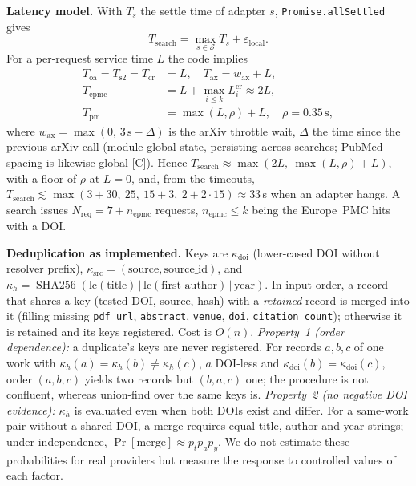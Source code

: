 \documentclass[conference]{IEEEtran}
\newcommand{\code}[1]{\texttt{\small #1}}
\begin{document}
\textbf{Latency model.} With $T_s$ the settle time of adapter $s$, \code{Promise.allSettled} gives
\begin{equation}
T_{\text{search}} = \max_{s\in\mathcal S} T_s + \varepsilon_{\text{local}}.
\label{eq:tsearch}
\end{equation}
For a per-request service time $L$ the code implies
\begin{align}
T_{\text{oa}} = T_{\text{s2}} = T_{\text{cr}} &= L, \quad T_{\text{ax}} = w_{\text{ax}} + L, \nonumber\\
T_{\text{epmc}} &= L + \max_{i\le k} L^{\text{cr}}_i \approx 2L, \nonumber\\
T_{\text{pm}} &= \max(L,\rho) + L, \quad \rho = 0.35\,\text{s},
\label{eq:adapters}
\end{align}
where $w_{\text{ax}}=\max(0,\,3\,\text{s}-\Delta)$ is the arXiv throttle wait, $\Delta$ the time since the previous arXiv call (module-global state, persisting across searches; PubMed spacing is likewise global [C]). Hence $T_{\text{search}} \approx \max(2L,\ \max(L,\rho)+L)$, with a floor of $\rho$ at $L{=}0$, and, from the timeouts, $T_{\text{search}} \lesssim \max(3{+}30,\ 25,\ 15{+}3,\ 2{+}2{\cdot}15)\approx 33$\,s when an adapter hangs. A search issues $N_{\text{req}} = 7+n_{\text{epmc}}$ requests, $n_{\text{epmc}}\le k$ being the Europe~PMC hits with a DOI.

\textbf{Deduplication as implemented.} Keys are $\kappa_{\text{doi}}$ (lower-cased DOI without resolver prefix), $\kappa_{\text{src}}=(\text{source},\text{source\_id})$, and $\kappa_{h}=\operatorname{SHA256}(\text{lc}(\text{title})\,|\,\text{lc}(\text{first author})\,|\,\text{year})$. In input order, a record that shares a key (tested DOI, source, hash) with a \emph{retained} record is merged into it (filling missing \code{pdf\_url}, \code{abstract}, \code{venue}, \code{doi}, \code{citation\_count}); otherwise it is retained and its keys registered. Cost is $O(n)$.
\emph{Property~1 (order dependence):} a duplicate's keys are never registered. For records $a,b,c$ of one work with $\kappa_h(a)=\kappa_h(b)\ne\kappa_h(c)$, $a$ DOI-less and $\kappa_{\text{doi}}(b)=\kappa_{\text{doi}}(c)$, order $(a,b,c)$ yields two records but $(b,a,c)$ one; the procedure is not confluent, whereas union-find over the same keys is.
\emph{Property~2 (no negative DOI evidence):} $\kappa_h$ is evaluated even when both DOIs exist and differ.
For a same-work pair without a shared DOI, a merge requires equal title, author and year strings; under independence, $\Pr[\text{merge}]\approx p_tp_ap_y$. We do not estimate these probabilities for real providers but measure the response to controlled values of each factor.
\end{document}
